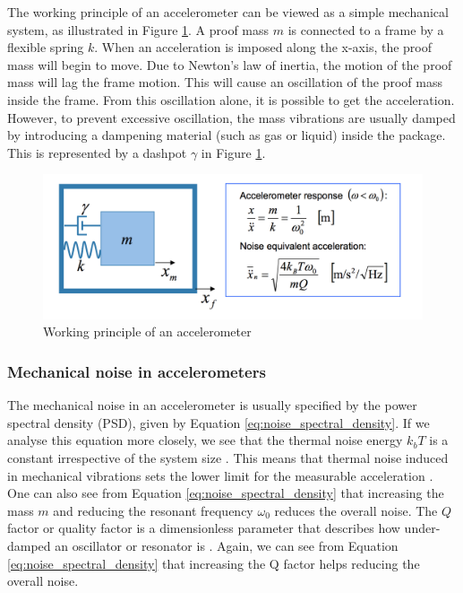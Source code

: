 The working principle of an accelerometer can be viewed as a simple mechanical system, as illustrated in Figure \ref{fig:accel_working_principle}. A proof mass $m$ is connected to a frame by a flexible spring $k$. When an acceleration is imposed along the x-axis, the proof mass will begin to move. Due to Newton's law of inertia, the motion of the proof mass will lag the frame motion. This will cause an oscillation of the proof mass inside the frame. From this oscillation alone, it is possible to get the acceleration. However, to prevent excessive oscillation, the mass vibrations are usually damped by introducing a dampening material (such as gas or liquid) inside the package. This is represented by a dashpot $\gamma$ in Figure \ref{fig:accel_working_principle}.

\begin{figure}[h]
\centering
\includegraphics[scale=0.5]{fig/accelerometer_working_principle.png}
\caption{Working principle of an accelerometer \cite[~p.34]{kaajakari09}}
\label{fig:accel_working_principle}
\end{figure}

\subsubsection{Mechanical noise in accelerometers}
\label{sec:mechanical_noise}
The mechanical noise in an accelerometer is usually specified by the power spectral density (PSD), given by Equation \ref{eq:noise_spectral_density}. If we analyse this equation more closely, we see that the thermal noise energy $k_b T$ is a constant irrespective of the system size \cite[~p.13]{kaajakari09}. This means that thermal noise induced in mechanical vibrations sets the lower limit for the measurable acceleration \cite[~p.41]{kaajakari09}. One can also see from Equation \ref{eq:noise_spectral_density} that increasing the mass $m$ and reducing the resonant frequency $\omega_0$ reduces the overall noise. The $Q$ factor or quality factor is a dimensionless parameter that describes how under-damped an oscillator or resonator is \cite{resonance}. Again, we can see from Equation \ref{eq:noise_spectral_density} that increasing the Q factor helps reducing the overall noise.

